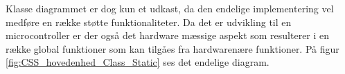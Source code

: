 Klasse diagrammet er dog kun et udkast, da den endelige implementering vel medføre en række støtte funktionaliteter. Da det er udvikling til en microcontroller er der også det hardware mæssige aspekt som resulterer i en række global funktioner som kan tilgåes fra hardwarenære funktioner. På figur \ref{fig:CSS_hovedenhed_Class_Static} ses det endelige diagram.